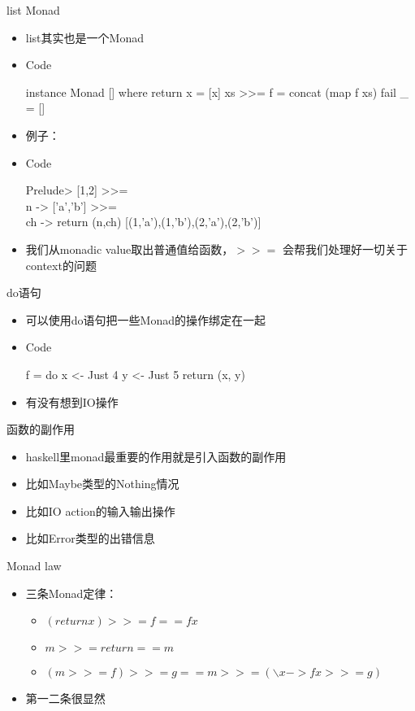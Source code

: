 \documentclass[xcolor=dvipsnames, 11pt]{beamer}
\newenvironment{code}{\begin{block}{Code}\begin{semiverbatim} \begin{footnotesize}}{\end{footnotesize}\end{semiverbatim}\end{block}}
\newenvironment{iit}{\begin{itemize}\setlength{\itemsep}{0.2cm}}{\end{itemize}}
\begin{document}
\begin{frame}[fragile]{list Monad}
\begin{iit}
\item<2->list其实也是一个Monad
\item<3->[]\begin{code}
instance Monad [] where   
    return x = [x]   
    xs >>= f = concat (map f xs)   
    fail _ = []
\end{code}
\item<4->例子：
\item<5->[]\begin{code}
Prelude> [1,2] >>= \\n -> ['a','b'] >>= \\ch -> return (n,ch)   
[(1,'a'),(1,'b'),(2,'a'),(2,'b')]
\end{code}
\item<6->我们从monadic value取出普通值给函数，$>>=$ 会帮我们处理好一切关于context的问题
\end{iit}
\end{frame}

\begin{frame}[fragile]{do语句}
\begin{iit}
\item<2->可以使用do语句把一些Monad的操作绑定在一起
\item<3->[]\begin{code}
f = do
    x <- Just 4
    y <- Just 5
    return (x, y)
\end{code}
\item<4->有没有想到IO操作
\end{iit}
\end{frame}

\begin{frame}[fragile]{函数的副作用}
\begin{iit}
\item<2->haskell里monad最重要的作用就是引入函数的副作用
\item<3->比如Maybe类型的Nothing情况
\item<4->比如IO action的输入输出操作
\item<5->比如Error类型的出错信息
\end{iit}
\end{frame}

\begin{frame}[fragile]{Monad law}
\begin{iit}
\item<2->三条Monad定律：
\begin{iit}
\item<3->$(return x) >>= f == f x$
\item<4->$m >>= return == m$
\item<5->$(m >>= f) >>= g == m >>= (\backslash x -> f x >>= g)$
\end{iit}
\item<6->第一二条很显然
\end{iit}
\end{frame}
\end{document}
